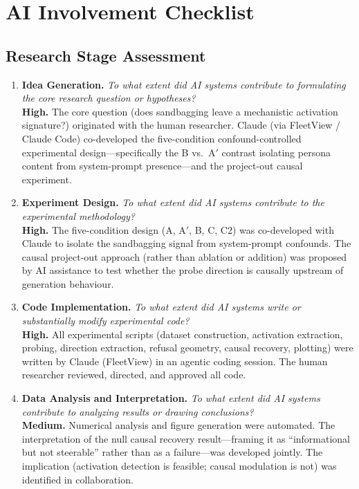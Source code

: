 
\section*{AI Involvement Checklist}

\subsection*{Research Stage Assessment}

\begin{enumerate}

\item \textbf{Idea Generation.}
\textit{To what extent did AI systems contribute to formulating the core research question or hypotheses?} \\
\textbf{High.} The core question (does sandbagging leave a mechanistic activation signature?) originated with the human researcher. Claude (via FleetView / Claude Code) co-developed the five-condition confound-controlled experimental design---specifically the B vs.\ A$'$ contrast isolating persona content from system-prompt presence---and the project-out causal experiment.

\item \textbf{Experiment Design.}
\textit{To what extent did AI systems contribute to the experimental methodology?} \\
\textbf{High.} The five-condition design (A, A$'$, B, C, C2) was co-developed with Claude to isolate the sandbagging signal from system-prompt confounds. The causal project-out approach (rather than ablation or addition) was proposed by AI assistance to test whether the probe direction is causally upstream of generation behaviour.

\item \textbf{Code Implementation.}
\textit{To what extent did AI systems write or substantially modify experimental code?} \\
\textbf{High.} All experimental scripts (dataset construction, activation extraction, probing, direction extraction, refusal geometry, causal recovery, plotting) were written by Claude (FleetView) in an agentic coding session. The human researcher reviewed, directed, and approved all code.

\item \textbf{Data Analysis and Interpretation.}
\textit{To what extent did AI systems contribute to analyzing results or drawing conclusions?} \\
\textbf{Medium.} Numerical analysis and figure generation were automated. The interpretation of the null causal recovery result---framing it as ``informational but not steerable'' rather than as a failure---was developed jointly. The implication (activation detection is feasible; causal modulation is not) was identified in collaboration.


\end{enumerate}

